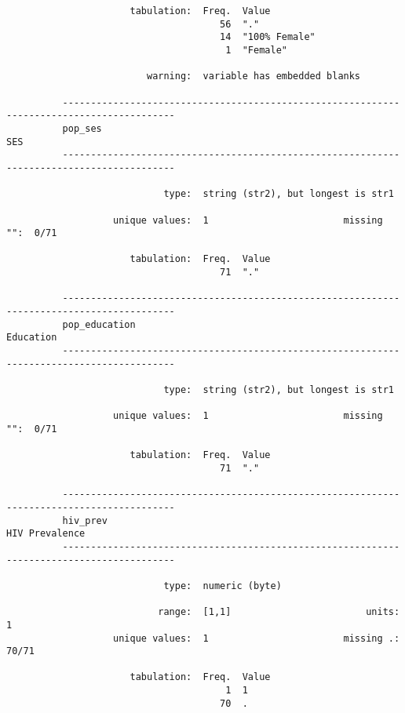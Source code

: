 \documentclass{article}
\begin{document}
\begin{verbatim}
                      tabulation:  Freq.  Value
                                      56  "."
                                      14  "100% Female"
                                       1  "Female"
          
                         warning:  variable has embedded blanks
          
          ------------------------------------------------------------------------------------------
          pop_ses                                                                                SES
          ------------------------------------------------------------------------------------------
          
                            type:  string (str2), but longest is str1
          
                   unique values:  1                        missing "":  0/71
          
                      tabulation:  Freq.  Value
                                      71  "."
          
          ------------------------------------------------------------------------------------------
          pop_education                                                                    Education
          ------------------------------------------------------------------------------------------
          
                            type:  string (str2), but longest is str1
          
                   unique values:  1                        missing "":  0/71
          
                      tabulation:  Freq.  Value
                                      71  "."
          
          ------------------------------------------------------------------------------------------
          hiv_prev                                                                    HIV Prevalence
          ------------------------------------------------------------------------------------------
          
                            type:  numeric (byte)
          
                           range:  [1,1]                        units:  1
                   unique values:  1                        missing .:  70/71
          
                      tabulation:  Freq.  Value
                                       1  1
                                      70  .
          

\end{verbatim}
\end{document}
